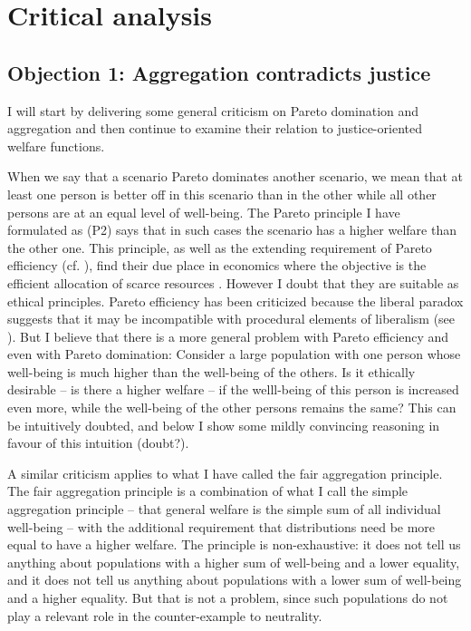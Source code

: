 \chapter{Critical analysis}
\section{Objection 1: Aggregation contradicts justice}

I will start by delivering some general criticism on Pareto domination and aggregation and then continue to examine their relation to justice-oriented welfare functions.  

When we say that a scenario Pareto dominates another scenario, we mean that at least one person is better off in this scenario than in the other while all other persons are at an equal level of well-being. The Pareto principle I have formulated as (P2) says that in such cases the scenario has a higher welfare than the other one. This principle, as well as the extending requirement of Pareto efficiency (cf. ), find their due place in economics where the objective is the efficient allocation of scarce resources \cite[p.~4]{samuelson_2010}. However I doubt that they are suitable as ethical principles. Pareto efficiency has been criticized because the liberal paradox suggests that it may be incompatible with procedural elements of liberalism (see \cite{sen_1997}). But I believe that there is a more general problem with Pareto efficiency and even with Pareto domination: Consider a large population with one person whose well-being is much higher than the well-being of the others. Is it ethically desirable – is there a higher welfare – if the welll-being of this person is increased even more, while the well-being of the other persons remains the same? This can be intuitively doubted, and below I show some mildly convincing reasoning in favour of this intuition (doubt?).  

A similar criticism applies to what I have called the fair aggregation principle. The fair aggregation principle is a combination of what I call the simple aggregation principle – that general welfare is the simple sum of all individual well-being – with the additional requirement that distributions need be more equal to have a higher welfare. The principle is non-exhaustive: it does not tell us anything about populations with a higher sum of well-being and a lower equality, and it does not tell us anything about populations with a lower sum of well-being and a higher equality. But that is not a problem, since such populations do not play a relevant role in the counter-example to neutrality.  

